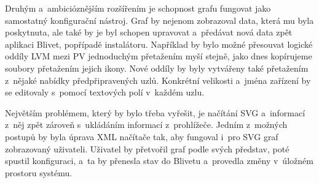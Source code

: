 \documentclass[color,table,oneside,nolot,nolof]{fithesis}
\begin{document}
	Druhým a~ambicióznějším rozšířením je schopnost grafu fungovat jako samostatný konfigurační nástroj. Graf by nejenom zobrazoval data, která mu byla poskytnuta, ale také by je byl
	schopen upravovat a~předávat nová data zpět aplikaci Blivet, popřípadě instalátoru. Například by bylo možné přesouvat logické oddíly LVM mezi PV jednoduchým 
	přetažením myší stejně, jako dnes kopírujeme soubory přetažením jejich ikony. Nové oddíly by byly vytvářeny také přetažením z~nějaké nabídky předpřipravených uzlů. Konkrétní velikosti
	a~jména zařízení by se editovaly s~pomocí textových polí v~každém uzlu.
	
	Největším problémem, který by bylo třeba vyřešit, je načítání SVG a~informací z~něj zpět zároveň s~ukládáním informací z~prohlížeče. 
	Jedním z~možných postupů by byla úprava XML načítače tak, aby fungoval i~pro SVG graf zobrazovaný uživateli. Uživatel by přetvořil graf podle svých představ, poté spustil 
	konfiguraci, a~ta by přenesla stav do Blivetu a~provedla změny v~úložném prostoru systému. 

	\printbibliography
\end{document}
